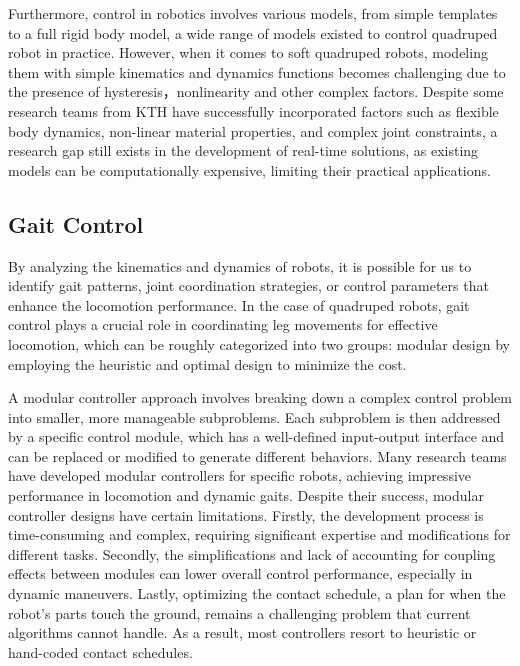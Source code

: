 Furthermore, control in robotics involves various models, from simple templates to a full rigid body model, a wide range of models existed to control quadruped robot in practice\cite{hwangboSimulationRealWorld2018}. However, when it comes to soft quadruped robots, modeling them with simple kinematics and dynamics functions becomes challenging due to the presence of hysteresis，nonlinearity and other complex factors. Despite some research teams from KTH\cite{daneliaStructureGaitOptimizationof2021, lagreliusComparingFourModelling2022} have successfully incorporated factors such as flexible body dynamics, non-linear material properties, and complex joint constraints, a research gap still exists in the development of real-time solutions, as existing models can be computationally expensive, limiting their practical applications.

\subsection{Gait Control}
By analyzing the kinematics and dynamics of robots, it is possible for us to identify gait patterns, joint coordination strategies, or control parameters that enhance the locomotion performance. In the case of quadruped robots, gait control plays a crucial role in coordinating leg movements for effective locomotion, which can be roughly categorized into two groups:  modular design by employing the heuristic and optimal design to minimize the cost. 

A modular controller approach involves breaking down a complex control problem into smaller, more manageable subproblems. Each subproblem is then addressed by a specific control module, which has a well-defined input-output interface and can be replaced or modified to generate different behaviors. Many research teams have developed modular controllers for specific robots\cite{hutterANYmalHighlyMobile2016,bledtMITCheetahDesign2018,jiOmnidirectionalWalkingQuadruped2022}, achieving impressive performance in locomotion and dynamic gaits. Despite their success, modular controller designs have certain limitations. Firstly, the development process is time-consuming and complex, requiring significant expertise and modifications for different tasks. Secondly, the simplifications and lack of accounting for coupling effects between modules can lower overall control performance, especially in dynamic maneuvers. Lastly, optimizing the contact schedule, a plan for when the robot's parts touch the ground, remains a challenging problem that current algorithms cannot handle\cite{bledtContactModelFusion2018}. As a result, most controllers resort to heuristic or hand-coded contact schedules.

